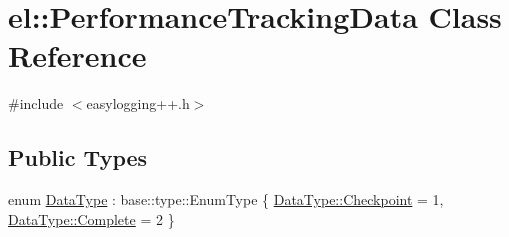 \hypertarget{classel_1_1_performance_tracking_data}{}\section{el\+:\+:Performance\+Tracking\+Data Class Reference}
\label{classel_1_1_performance_tracking_data}


{\ttfamily \#include $<$easylogging++.\+h$>$}

\subsection*{Public Types}
\begin{DoxyCompactItemize}
\item 
enum \hyperlink{classel_1_1_performance_tracking_data_a1b45d5b1d5e76d0687aaffcf08302f17}{Data\+Type} \+: base\+::type\+::\+Enum\+Type \{ \hyperlink{classel_1_1_performance_tracking_data_a1b45d5b1d5e76d0687aaffcf08302f17aef41311079c448d0beb06ec07db0bf8c}{Data\+Type\+::\+Checkpoint} = 1, 
\hyperlink{classel_1_1_performance_tracking_data_a1b45d5b1d5e76d0687aaffcf08302f17aae94f80b3ce82062a5dd7815daa04f9d}{Data\+Type\+::\+Complete} = 2
 \}
\end{DoxyCompactItemize}
